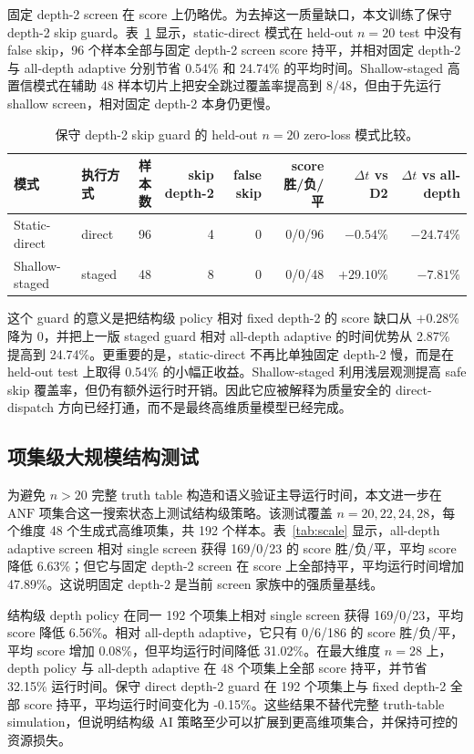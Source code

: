 \documentclass[UTF8,fontset=macnew,11pt]{ctexart}
\newcommand{\anf}{\ensuremath{\mathrm{ANF}}}
\begin{document}
固定 depth-2 screen 在 score 上仍略优。为去掉这一质量缺口，本文训练了保守 depth-2 skip guard。表~\ref{tab:guard} 显示，static-direct 模式在 held-out $n=20$ test 中没有 false skip，96 个样本全部与固定 depth-2 screen score 持平，并相对固定 depth-2 与 all-depth adaptive 分别节省 0.54\% 和 24.74\% 的平均时间。Shallow-staged 高置信模式在辅助 48 样本切片上把安全跳过覆盖率提高到 8/48，但由于先运行 shallow screen，相对固定 depth-2 本身仍更慢。

\begin{table}[t]
\centering
\scriptsize
\caption{保守 depth-2 skip guard 的 held-out $n=20$ zero-loss 模式比较。}
\label{tab:guard}
\begin{tabular}{llrrrrrr}
\toprule
模式 & 执行方式 & 样本数 & skip depth-2 & false skip & score 胜/负/平 & $\Delta t$ vs D2 & $\Delta t$ vs all-depth \\
\midrule
Static-direct & direct & 96 & 4 & 0 & 0/0/96 & $-0.54\%$ & $-24.74\%$ \\
Shallow-staged & staged & 48 & 8 & 0 & 0/0/48 & $+29.10\%$ & $-7.81\%$ \\
\bottomrule
\end{tabular}
\end{table}

这个 guard 的意义是把结构级 policy 相对 fixed depth-2 的 score 缺口从 $+0.28\%$ 降为 $0$，并把上一版 staged guard 相对 all-depth adaptive 的时间优势从 2.87\% 提高到 24.74\%。更重要的是，static-direct 不再比单独固定 depth-2 慢，而是在 held-out test 上取得 0.54\% 的小幅正收益。Shallow-staged 利用浅层观测提高 safe skip 覆盖率，但仍有额外运行时开销。因此它应被解释为质量安全的 direct-dispatch 方向已经打通，而不是最终高维质量模型已经完成。

\subsection{项集级大规模结构测试}

为避免 $n>20$ 完整 truth table 构造和语义验证主导运行时间，本文进一步在 \anf{} 项集合这一搜索状态上测试结构级策略。该测试覆盖 $n=20,22,24,28$，每个维度 48 个生成式高维项集，共 192 个样本。表~\ref{tab:scale} 显示，all-depth adaptive screen 相对 single screen 获得 169/0/23 的 score 胜/负/平，平均 score 降低 6.63\%；但它与固定 depth-2 screen 在 score 上全部持平，平均运行时间增加 47.89\%。这说明固定 depth-2 是当前 screen 家族中的强质量基线。

结构级 depth policy 在同一 192 个项集上相对 single screen 获得 169/0/23，平均 score 降低 6.56\%。相对 all-depth adaptive，它只有 0/6/186 的 score 胜/负/平，平均 score 增加 0.08\%，但平均运行时间降低 31.02\%。在最大维度 $n=28$ 上，depth policy 与 all-depth adaptive 在 48 个项集上全部 score 持平，并节省 32.15\% 运行时间。保守 direct depth-2 guard 在 192 个项集上与 fixed depth-2 全部 score 持平，平均运行时间变化为 -0.15\%。这些结果不替代完整 truth-table simulation，但说明结构级 AI 策略至少可以扩展到更高维项集合，并保持可控的资源损失。
\end{document}
